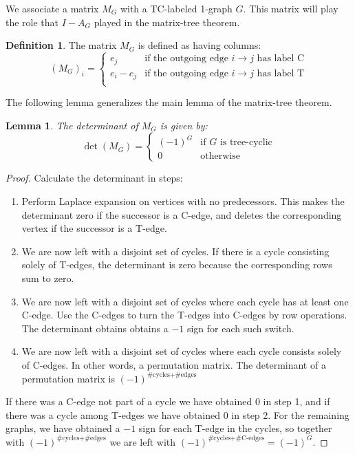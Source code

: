 \documentclass[a4paper, 11pt]{article}
\newtheorem{lemma}[theorem]{Lemma}
\theoremstyle{definition}
\newtheorem{definition}{Definition}[section]
\begin{document}
We associate a matrix $M_G$ with a TC-labeled 1-graph $G$. This matrix will play the role that $I - A_G$ played in the matrix-tree theorem.

\begin{definition}
  The matrix $M_G$ is defined as having columns:
  \[
    (M_G)_i = \begin{cases}
      e_j & \text{if the outgoing edge $i \to j$ has label C} \\
      e_i - e_j & \text{if the outgoing edge $i \to j$ has label T} \\
    \end{cases}
  \]
\end{definition}

The following lemma generalizes the main lemma of the matrix-tree theorem.

\begin{lemma}
  The determinant of $M_G$ is given by:
  \[
    \det(M_G) = \begin{cases}
      (-1)^G & \text{if $G$ is tree-cyclic} \\
      0 & \text{otherwise}
    \end{cases}
  \]
\end{lemma}
\begin{proof}
  Calculate the determinant in steps:
  \begin{enumerate}
    \item Perform Laplace expansion on vertices with no predecessors. This makes the determinant zero if the successor is a C-edge, and deletes the corresponding vertex if the successor is a T-edge.
    \item We are now left with a disjoint set of cycles. If there is a cycle consisting solely of T-edges, the determinant is zero because the corresponding rows sum to zero.
    \item We are now left with a disjoint set of cycles where each cycle has at least one C-edge. Use the C-edges to turn the T-edges into C-edges by row operations. The determinant obtains obtains a $-1$ sign for each such switch.
    \item We are now left with a disjoint set of cycles where each cycle consists solely of C-edges. In other words, a permutation matrix. The determinant of a permutation matrix is $(-1)^{\text{\#cycles} + \text{\#edges}}$
  \end{enumerate}
  If there was a C-edge not part of a cycle we have obtained $0$ in step 1, and if there was a cycle among T-edges we have obtained $0$ in step 2. For the remaining graphs, we have obtained a $-1$ sign for each T-edge in the cycles, so together with $(-1)^{\text{\#cycles} + \text{\#edges}}$ we are left with $(-1)^{\text{\#cycles} + \text{\#C-edges}} = (-1)^G$.
\end{proof}
\end{document}
